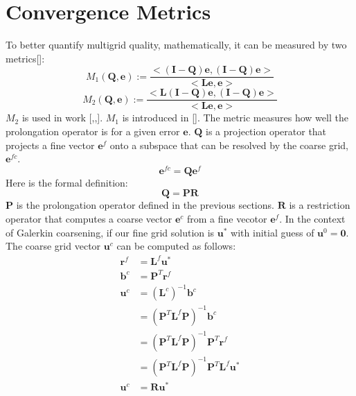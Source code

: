 \section{Convergence Metrics} 
  To better quantify multigrid quality, mathematically, it can be measured by two metrics[\cite{brezina2001algebraic}]: 
\begin{equation}
\label{equ:M1}
M_1(\mathbf{Q},\mathbf{e}) := \frac{<(\mathbf{I}-\mathbf{Q})\mathbf{e}, (\mathbf{I}-\mathbf{Q})\mathbf{e}>}{<\mathbf{L}\mathbf{e},\mathbf{e}>}
\end{equation}
\begin{equation}
\label{equ:M2}
M_2(\mathbf{Q},\mathbf{e}) := \frac{<\mathbf{L}(\mathbf{I}-\mathbf{Q})\mathbf{e}, (\mathbf{I}-\mathbf{Q})\mathbf{e}>}{<\mathbf{L}\mathbf{e},\mathbf{e}>}
\end{equation}
$M_2$ is used in work [\cite{mccormick1984multigrid},\cite{mccormick1982multigrid},\cite{mccormick1985multigrid}]. $M_1$ is introduced in [\cite{brandt1986algebraic}]. The metric measures how well the prolongation operator is for a given error $\mathbf{e}$. $\mathbf{Q}$ is a projection operator that projects a fine vector $\mathbf{e}^f$ onto a subspace that can be resolved by the coarse grid, $\mathbf{e}^{fc}$. 
$$
\mathbf{e}^{fc} = \mathbf{Q}\mathbf{e}^f
$$
Here is the formal definition: 
\begin{equation}
\mathbf{Q} = \mathbf{P}\mathbf{R}
\end{equation}
$\mathbf{P}$ is the prolongation operator defined in the previous sections. $\mathbf{R}$ is a restriction operator that computes a coarse vector $\mathbf{e}^c$ from a fine vecotor $\mathbf{e}^f$. In the context of Galerkin coarsening, if our fine grid solution is $\mathbf{u}^*$ with initial guess of $\mathbf{u}^0 = \mathbf{0}$. The coarse grid vector $\mathbf{u}^c$ can be computed as follows:
\begin{align*}
\mathbf{r}^f &= \mathbf{L}^f\mathbf{u}^* \\
\mathbf{b}^c &= \mathbf{P}^T\mathbf{r}^f \\
\mathbf{u}^c &= (\mathbf{L}^c)^{-1}\mathbf{b}^c \\
&=  (\mathbf{P}^T\mathbf{L}^f\mathbf{P})^{-1}\mathbf{b}^c \\
&=  (\mathbf{P}^T\mathbf{L}^f\mathbf{P})^{-1}\mathbf{P}^T\mathbf{r}^f \\
&= (\mathbf{P}^T\mathbf{L}^f\mathbf{P})^{-1}\mathbf{P}^T\mathbf{L}^f\mathbf{u}^* \\
\mathbf{u}^c &= \mathbf{R} \mathbf{u}^*
\end{align*}
